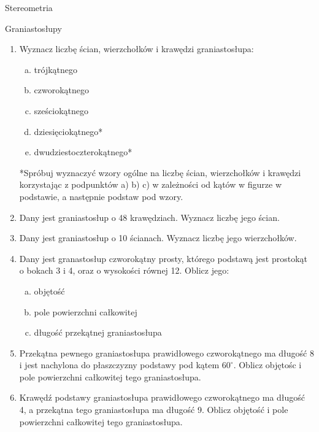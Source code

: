 \documentclass[12pt,a4paper]{article}
\begin{document}
	\begin{center}
		\LARGE Stereometria
	\end{center}
	
	\begin{center}
		\large Graniastosłupy
	\end{center}
	
	\begin{enumerate}[1.]
	\item Wyznacz liczbę ścian, wierzchołków i krawędzi graniastosłupa:
		\begin{enumerate}[a)]
			\item trójkątnego
			\item czworokątnego
			\item sześciokątnego
			\item dziesięciokątnego*
			\item dwudziestoczterokątnego*
		\end{enumerate}
		
	*Spróbuj wyznaczyć wzory ogólne na liczbę ścian, wierzchołków i krawędzi korzystając z podpunktów a) b) c) w zależności od kątów w figurze w podstawie, a następnie podstaw pod wzory.
		
	\item Dany jest graniastosłup o 48 krawędziach. Wyznacz liczbę jego ścian.
	\item Dany jest graniastosłup o 10 ścianach. Wyznacz liczbę jego wierzchołków.
		
	\item Dany jest granastosłup czworokątny prosty, którego podstawą jest prostokąt o bokach 3 i 4, oraz o wysokości równej 12. Oblicz jego:
	\begin{enumerate}[a)]
		\item objętość
		\item pole powierzchni całkowitej
		\item długość przekątnej graniastosłupa
	\end{enumerate}
	
	\item Przekątna pewnego graniastosłupa prawidłowego czworokątnego ma długość 8 i jest nachylona do płaszczyzny podstawy pod kątem $60^\circ$. Oblicz objętośc i pole powierzchni całkowitej tego graniastosłupa.
	
	\item Krawędź podstawy graniastosłupa prawidłowego czworokątnego ma długość 4, a przekątna tego graniastosłupa ma długość 9. Oblicz objętość i pole powierzchni całkowitej tego graniastosłupa.
	

\end{enumerate}
\end{document}
